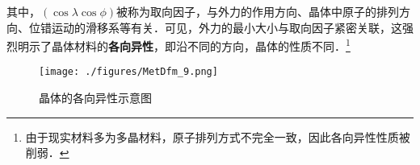 其中，$(\cos \lambda \cos \phi)$被称为取向因子，与外力的作用方向、晶体中原子的排列方向、位错运动的滑移系等有关．可见，外力的最小大小与取向因子紧密关联，这强烈明示了晶体材料的\textbf{各向异性}，即沿不同的方向，晶体的性质不同．\footnote{由于现实材料多为多晶材料，原子排列方式不完全一致，因此各向异性性质被削弱．}

\begin{figure}[ht]
\centering
\texttt{[image: ./figures/MetDfm\_9.png]}
\caption{晶体的各向异性示意图} \label{MetDfm_fig9}
\end{figure}
